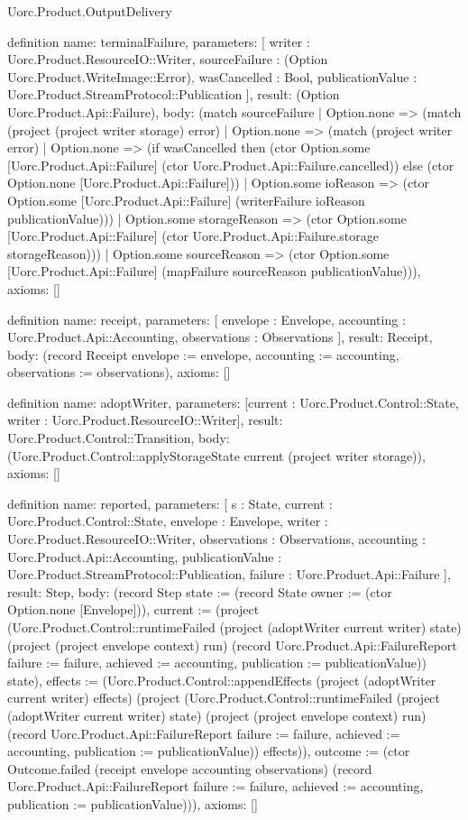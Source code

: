 \begin{lexlean}{Uorc.Product.OutputDelivery}
\begin{semanticmodule}
definition{
  name: terminalFailure,
  parameters: [
    writer : Uorc.Product.ResourceIO::Writer,
    sourceFailure : (Option Uorc.Product.WriteImage::Error),
    wasCancelled : Bool,
    publicationValue : Uorc.Product.StreamProtocol::Publication
  ],
  result: (Option Uorc.Product.Api::Failure),
  body: (match sourceFailure
    | Option.none => (match (project (project writer storage) error)
      | Option.none => (match (project writer error)
        | Option.none => (if wasCancelled then (ctor Option.some [Uorc.Product.Api::Failure] (ctor Uorc.Product.Api::Failure.cancelled)) else (ctor Option.none [Uorc.Product.Api::Failure]))
        | Option.some ioReason => (ctor Option.some [Uorc.Product.Api::Failure] (writerFailure ioReason publicationValue)))
      | Option.some storageReason => (ctor Option.some [Uorc.Product.Api::Failure] (ctor Uorc.Product.Api::Failure.storage storageReason)))
    | Option.some sourceReason => (ctor Option.some [Uorc.Product.Api::Failure] (mapFailure sourceReason publicationValue))),
  axioms: []
}

definition{
  name: receipt,
  parameters: [
    envelope : Envelope,
    accounting : Uorc.Product.Api::Accounting,
    observations : Observations
  ],
  result: Receipt,
  body: (record Receipt {envelope := envelope, accounting := accounting, observations := observations}),
  axioms: []
}

definition{
  name: adoptWriter,
  parameters: [current : Uorc.Product.Control::State, writer : Uorc.Product.ResourceIO::Writer],
  result: Uorc.Product.Control::Transition,
  body: (Uorc.Product.Control::applyStorageState current (project writer storage)),
  axioms: []
}

definition{
  name: reported,
  parameters: [
    s : State,
    current : Uorc.Product.Control::State,
    envelope : Envelope,
    writer : Uorc.Product.ResourceIO::Writer,
    observations : Observations,
    accounting : Uorc.Product.Api::Accounting,
    publicationValue : Uorc.Product.StreamProtocol::Publication,
    failure : Uorc.Product.Api::Failure
  ],
  result: Step,
  body: (record Step {state := (record State {owner := (ctor Option.none [Envelope])}), current := (project (Uorc.Product.Control::runtimeFailed (project (adoptWriter current writer) state) (project (project envelope context) run) (record Uorc.Product.Api::FailureReport {failure := failure, achieved := accounting, publication := publicationValue})) state), effects := (Uorc.Product.Control::appendEffects (project (adoptWriter current writer) effects) (project (Uorc.Product.Control::runtimeFailed (project (adoptWriter current writer) state) (project (project envelope context) run) (record Uorc.Product.Api::FailureReport {failure := failure, achieved := accounting, publication := publicationValue})) effects)), outcome := (ctor Outcome.failed (receipt envelope accounting observations) (record Uorc.Product.Api::FailureReport {failure := failure, achieved := accounting, publication := publicationValue}))}),
  axioms: []
}


\end{semanticmodule}
\end{lexlean}
